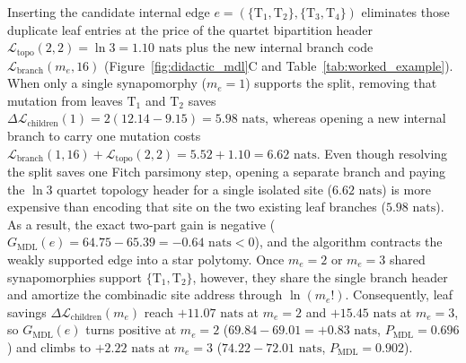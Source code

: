 \documentclass[11pt,a4paper]{article}
\begin{document}
Inserting the candidate internal edge $e = (\{\text{T}_1, \text{T}_2\}, \{\text{T}_3, \text{T}_4\})$ eliminates those duplicate leaf entries at the price of the quartet bipartition header $\mathcal{L}_{\text{topo}}(2,2) = \ln 3 = 1.10\text{ nats}$ plus the new internal branch code $\mathcal{L}_{\text{branch}}(m_e, 16)$ (Figure~\ref{fig:didactic_mdl}C and Table~\ref{tab:worked_example}). When only a single synapomorphy ($m_e = 1$) supports the split, removing that mutation from leaves $\text{T}_1$ and $\text{T}_2$ saves $\Delta\mathcal{L}_{\text{children}}(1) = 2(12.14 - 9.15) = 5.98\text{ nats}$, whereas opening a new internal branch to carry one mutation costs $\mathcal{L}_{\text{branch}}(1, 16) + \mathcal{L}_{\text{topo}}(2,2) = 5.52 + 1.10 = 6.62\text{ nats}$. Even though resolving the split saves one Fitch parsimony step, opening a separate branch and paying the $\ln 3$ quartet topology header for a single isolated site ($6.62\text{ nats}$) is more expensive than encoding that site on the two existing leaf branches ($5.98\text{ nats}$). As a result, the exact two-part gain is negative ($G_{\text{MDL}}(e) = 64.75 - 65.39 = -0.64\text{ nats} < 0$), and the algorithm contracts the weakly supported edge into a star polytomy. Once $m_e = 2$ or $m_e = 3$ shared synapomorphies support $\{\text{T}_1, \text{T}_2\}$, however, they share the single branch header and amortize the combinadic site address through $\ln(m_e!)$. Consequently, leaf savings $\Delta\mathcal{L}_{\text{children}}(m_e)$ reach $+11.07\text{ nats}$ at $m_e = 2$ and $+15.45\text{ nats}$ at $m_e = 3$, so $G_{\text{MDL}}(e)$ turns positive at $m_e = 2$ ($69.84 - 69.01 = +0.83\text{ nats}$, $P_{\text{MDL}} = 0.696$) and climbs to $+2.22\text{ nats}$ at $m_e = 3$ ($74.22 - 72.01\text{ nats}$, $P_{\text{MDL}} = 0.902$).
\end{document}
